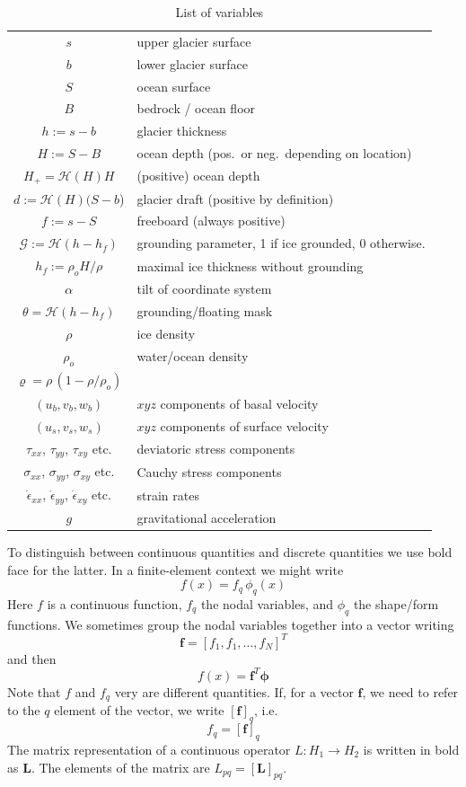 \documentclass[10pt,a4paper]{book}
\newcommand{\He}{\mathcal{H}}
\newcommand{\G}{\mathcal{G}}
\newcommand{\exx}{\dot{\epsilon}_{xx}}
\newcommand{\eyy}{\dot{\epsilon}_{yy}}
\newcommand{\exy}{\dot{\epsilon}_{xy}}
\newcommand{\txx}{\tau_{xx}}
\newcommand{\tyy}{\tau_{yy}}
\newcommand{\txy}{\tau_{xy}}
\newcommand{\sxx}{\sigma_{xx}}
\newcommand{\sxy}{\sigma_{xy}}
\newcommand{\syy}{\sigma_{yy}}
\begin{document}
\begin{table}[tb]
\caption{\label{tab:geo1} List of variables}
\begin{center}
\begin{tabular}{cl}
\hline
$s$ & upper glacier surface \\
$b$ & lower glacier surface \\
$S$ & ocean surface \\
$B$ & bedrock / ocean floor \\
$h:=s-b$ & glacier thickness \\
$H:=S-B$ & ocean depth (pos.\ or neg.\ depending on location) \\
$H_{+} = \He(H) H$ & (positive) ocean depth \\
$d:=\He(H) (S-b$) & glacier draft (positive by definition) \\
$f:=s-S$ & freeboard (always positive) \\
$ \G:=\He(h-h_f)$ & grounding parameter, 1 if ice grounded, 0 otherwise. \\
$h_f:=\rho_o H /\rho$ & maximal ice thickness without grounding \\
$\alpha$                    & tilt of coordinate system\\
$ \theta= \He(h-h_f)$       & grounding/floating mask \\
$\rho$ & ice density \\
$\rho_o$ & water/ocean density \\
$\varrho =\rho \, (1-\rho/\rho_o)$ & \\
$(u_b,v_b,w_b) $ & $xyz$ components of basal velocity \\
$(u_s,v_s,w_s) $ & $xyz$ components of surface velocity \\
$\txx$, $\tyy$, $\txy$ etc. & deviatoric stress components \\
$\sxx$, $\syy$, $\sxy$ etc. & Cauchy stress components\\
$\exx$, $\eyy$, $\exy$ etc. & strain rates \\
$g$                         & gravitational acceleration\\

\hline
\end{tabular}
\end{center}
\end{table}



To distinguish between continuous quantities and discrete quantities we
use bold face for the latter.  In a finite-element context we might
write
\[ 
f(x) = f_q \, \phi_q(x) 
\]
Here $f$ is a continuous function, $f_q$ the nodal variables, and
$\phi_q$ the shape/form functions. We sometimes group the nodal
variables together into a vector writing
\[
\bm{f}=[f_1, f_1, \dots , f_N]^T
\]
and then
\[
f(x) = \bm{f}^T \bm{\phi}
\]
Note that $f$ and $f_q$ very are different quantities. If, for a vector
$\bm{f}$, we need to refer to the $q$ element of the vector, we write
$[\bm{f}]_q$, i.e.
\[
f_q=[\bm{f}]_q
\] 
The matrix representation of a continuous operator $L: H_1 \to H_2$ is
written in bold as $\bm{L}$. The elements of the matrix are
$L_{pq}=[\bm{L}]_{pq}$.
\end{document}
